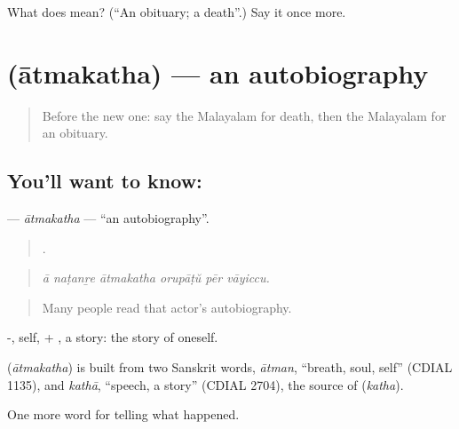\begin{tcolorbox}[breakable,colback=teal!4,colframe=teal!35!black,title={Before you move on}]
What does  mean? (\textquotedblleft{}An obituary; a death\textquotedblright{}.) Say it once more.
\end{tcolorbox}
\section[\texorpdfstring{\ml{ആത്മകഥ} (ātmakatha)}{ആത്മകഥ (ātmakatha)}]{ (ātmakatha) — an autobiography}

\label{lesson:ML-C384-atmakatha}



\begin{quote}
Before the new one: say the Malayalam for death, then the Malayalam for an obituary.
\end{quote}

\subsection*{You'll want to know: }
\textbf{} — \emph{ātmakatha} — \textquotedblleft{}an autobiography\textquotedblright{}.

\begin{quote}
     .
\end{quote}

\begin{quote}
\emph{ā naṭanṟe ātmakatha orupāṭŭ pēr vāyiccu.}
\end{quote}

\begin{quote}
Many people read that actor's autobiography.
\end{quote}

-, self, + , a story: the story of oneself.

\begin{cousinweb}
\textbf{} (\emph{ātmakatha}) is built from two Sanskrit words, \emph{ātman}, \textquotedblleft{}breath, soul, self\textquotedblright{} (CDIAL 1135), and \emph{kathā}, \textquotedblleft{}speech, a story\textquotedblright{} (CDIAL 2704), the source of  (\emph{katha}).
\end{cousinweb}

\begin{grammarlens}[title={What you've built}]
One more word for telling what happened.
\end{grammarlens}


